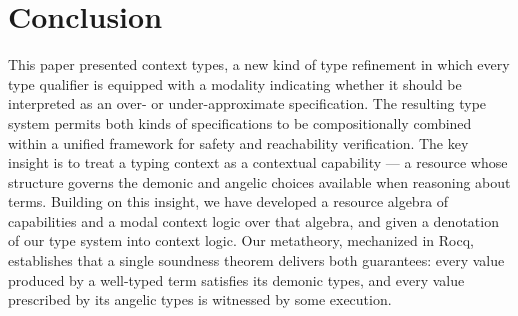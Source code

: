\section{Conclusion} %
\label{sec:conclusion}

This paper presented context types, a new kind of type refinement in
which every type qualifier is equipped with a modality indicating
whether it should be interpreted as an over- or under-approximate
specification. The resulting type system permits both kinds of
specifications to be compositionally combined within a unified
framework for safety and reachability verification. The key insight is
to treat a typing context as a contextual capability --- a resource
whose structure governs the demonic and angelic choices available when
reasoning about terms. Building on this insight, we have developed a
resource algebra of capabilities and a modal context logic over that
algebra, and given a denotation of our type system into context logic.
Our metatheory, mechanized in Rocq, establishes that a single
soundness theorem delivers both guarantees: every value produced by a
well-typed term satisfies its demonic types, and every value
prescribed by its angelic types is witnessed by some execution.

